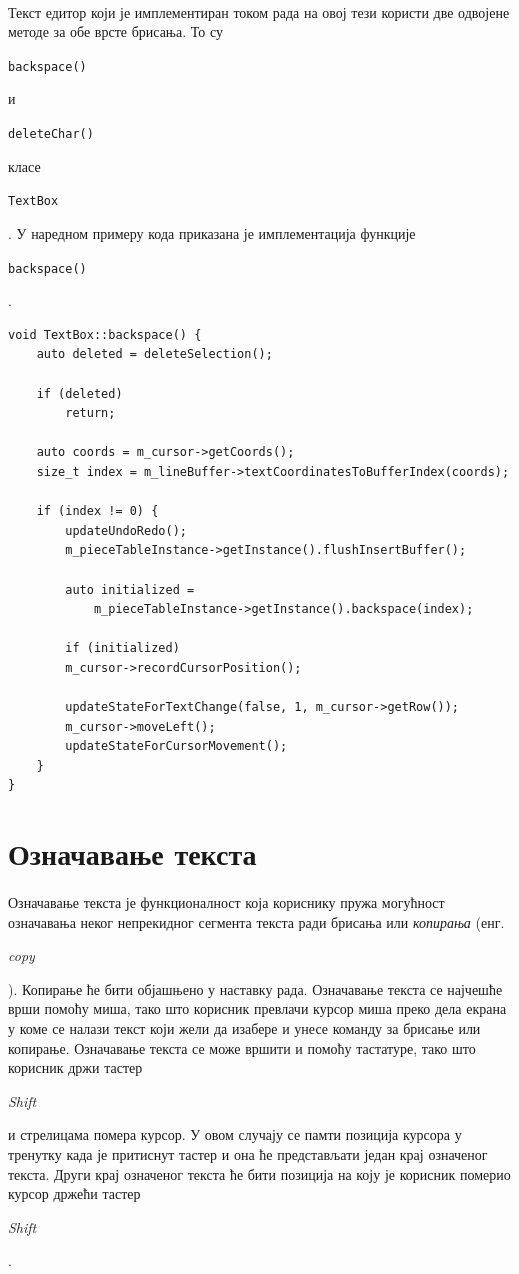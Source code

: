 \documentclass[12pt,oneside]{memoir}
\begin{document}
\paragraph{}
Текст едитор који је имплементиран током рада на овој тези користи две одвојене
методе за обе врсте брисања. То су 
\begin{latinica}\verb|backspace()| \end{latinica} и
\begin{latinica}\verb|deleteChar()| \end{latinica} класе
\begin{latinica}\verb|TextBox| \end{latinica}. У наредном примеру кода
приказана је имплементација функције \begin{latinica}\verb|backspace()| \end{latinica}.

\begin{verbatim}
void TextBox::backspace() {
	auto deleted = deleteSelection();
	
	if (deleted)
		return;
	
	auto coords = m_cursor->getCoords();
	size_t index = m_lineBuffer->textCoordinatesToBufferIndex(coords);
	
	if (index != 0) {
		updateUndoRedo();
		m_pieceTableInstance->getInstance().flushInsertBuffer();
		
		auto initialized = 
			m_pieceTableInstance->getInstance().backspace(index);
		
		if (initialized)
		m_cursor->recordCursorPosition();
		
		updateStateForTextChange(false, 1, m_cursor->getRow());
		m_cursor->moveLeft();
		updateStateForCursorMovement();
	}
}
\end{verbatim}

\section{Означавање текста}
\paragraph{}
Означавање текста је функционалност која кориснику пружа могућност означавања
неког непрекидног сегмента текста ради брисања или \emph{копирања}
(енг. \begin{latinica}\textit{copy}\end{latinica}). Копирање ће бити
објашњено у наставку рада. Означавање текста се најчешће врши помоћу миша, тако што корисник превлачи курсор миша преко дела екрана у коме се налази текст који жели да изабере
и унесе команду за брисање или копирање. Означавање текста се може вршити и помоћу тастатуре,
тако што корисник држи тастер \begin{latinica}\textit{Shift}\end{latinica} и стрелицама
помера курсор. У овом случају се памти позиција курсора у тренутку када је притиснут тастер 
и она ће представљати један крај означеног текста. Други крај означеног текста ће бити позиција на коју је корисник померио курсор држећи тастер
\begin{latinica}\textit{Shift}\end{latinica}.
\end{document}
